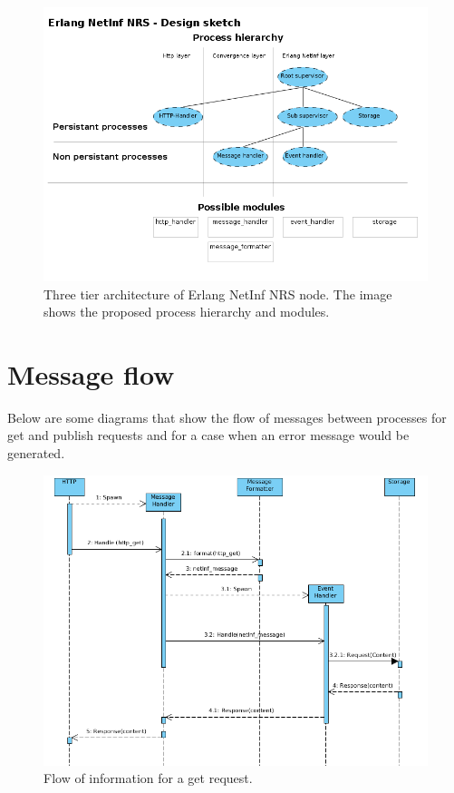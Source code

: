 \documentclass[11pt]{article}
\begin{document}
\begin{figure}[htb]
\centering
\includegraphics[width=1\textwidth]{pharch}
\caption{Three tier architecture of Erlang NetInf NRS node. The image shows the proposed process hierarchy and modules.}
\label{fig:architecture}
\end{figure}

\section*{Message flow}
Below are some diagrams that show the flow of messages between processes for get and publish requests and for a case when an error message would be generated.

\begin{figure}[htb]
\centering
\includegraphics[width=1\textwidth]{seq_get}
\caption{Flow of information for a get request.}
\label{fig:sequence_get}
\end{figure}
\end{document}
